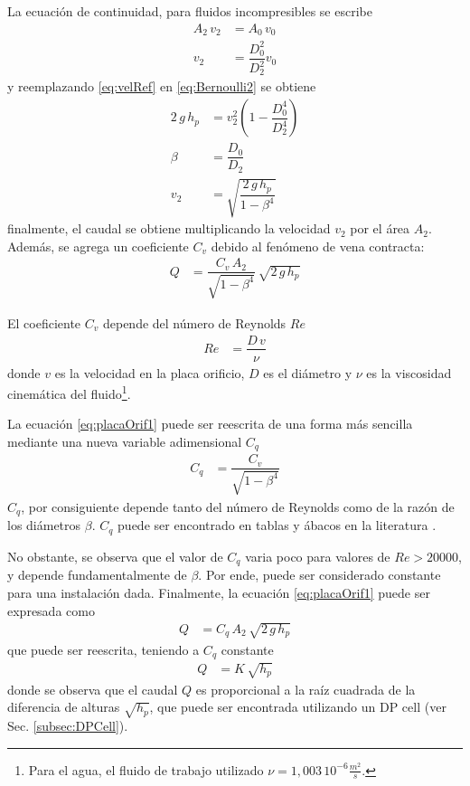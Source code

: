 La ecuación de continuidad, para fluidos incompresibles se escribe
\begin{align}
 A_2\,v_2 &= A_0\,v_0 \\
 v_2 &= \dfrac{D_0^2}{D_2^2} v_0
 \label{eq:velRef}
\end{align}
y reemplazando \eqref{eq:velRef} en \eqref{eq:Bernoulli2} se obtiene
\begin{align}
 2 \, g \, h_p &= v_2^2 \left( 1 - \dfrac{D_0^4}{D_2^4} \right)\\
 \beta &= \dfrac{D_0}{D_2}\\
 v_2 &= \sqrt{\dfrac{2 \, g \, h_p}{1-\beta^4}}
\end{align}
finalmente, el caudal se obtiene multiplicando la velocidad $v_2$ por el
área $A_2$.
Además, se agrega un coeficiente $C_v$ debido al fenómeno de vena contracta:
\begin{align}
 Q &= \dfrac{C_v \, A_2}{\sqrt{1-\beta^4}}\, \sqrt{2 \, g \, h_p}
 \label{eq:placaOrif1}
\end{align}

El coeficiente $C_v$ depende del número de Reynolds $Re$
\cite{bib:Mataix, bib:ApuntesPuglesiPlacaOrif}
\begin{align}
Re &= \dfrac{D\,v}{\nu}
\end{align}
donde $v$ es la velocidad en la placa orificio, $D$ es el diámetro y ${\nu}$
es la viscosidad cinemática del fluido\footnote{Para el agua, el fluido de
trabajo utilizado $\nu = 1,003\,10^{-6} \frac{m^2}{s}$.}.

La ecuación \eqref{eq:placaOrif1} puede ser reescrita de una forma más sencilla
mediante una nueva variable adimensional $C_q$
\begin{align}
 C_q &= \dfrac{C_v}{\sqrt{1-\beta^4}}
\end{align}
$C_q$, por consiguiente depende tanto del número de Reynolds como de la razón
de los diámetros $\beta$. $C_q$ puede ser encontrado en tablas y ábacos en la
literatura \cite{bib:Mataix}.

No obstante, se observa que el valor de $C_q$ varia poco para valores de
$Re > 20000$, y depende fundamentalmente de $\beta$.
Por ende, puede ser considerado constante para una instalación dada.
Finalmente, la ecuación \eqref{eq:placaOrif1} puede ser expresada como
\begin{align}
 Q &= C_q\,A_2\, \sqrt{2\,g\,h_p}
\end{align}
que puede ser reescrita, teniendo a $C_q$ constante
\begin{align}
 Q &= K\,\sqrt{h_p}
 \label{eq:placaOrifPLC}
\end{align}
donde se observa que el caudal $Q$ es proporcional a la raíz cuadrada de
la diferencia de alturas $\sqrt{h_p}$, que puede
ser encontrada utilizando un DP cell (ver Sec. \ref{subsec:DPCell}).

